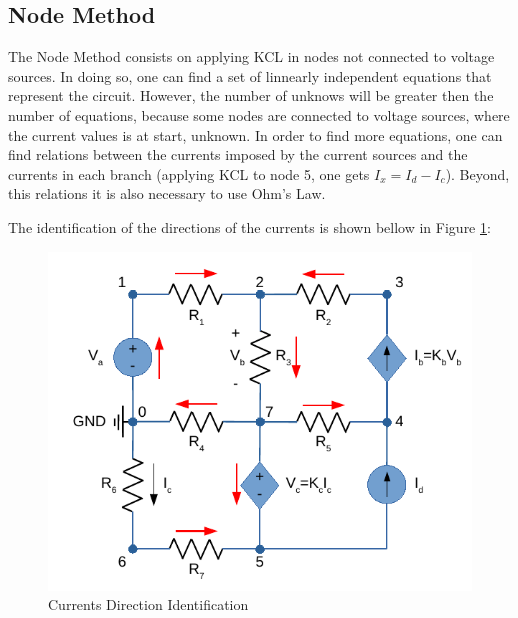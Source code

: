 \subsection{Node Method}
\label{subsec:Node Method}\par
The Node Method consists on applying KCL in nodes not connected to voltage sources. In doing so, one can find a set of linnearly independent equations that represent the circuit. However, the number of unknows will be greater then the number of equations, because some nodes are connected to voltage sources, where the current values is at start, unknown. In order to find more equations, one can find relations between the currents imposed by the current sources and the currents in each branch (applying KCL to node 5, one gets $I_{x} = I_{d}-I_{c}$). Beyond, this
relations it is also necessary to use Ohm's Law.\par
The identification of the directions of the currents is shown bellow in Figure \ref{fig:NodeMethod}:


\begin{figure}[H] \centering
  \includegraphics[width=0.7\linewidth]{NodeMethod.pdf}
  \caption{Currents Direction Identification}
  \label{fig:NodeMethod}
\end{figure}

